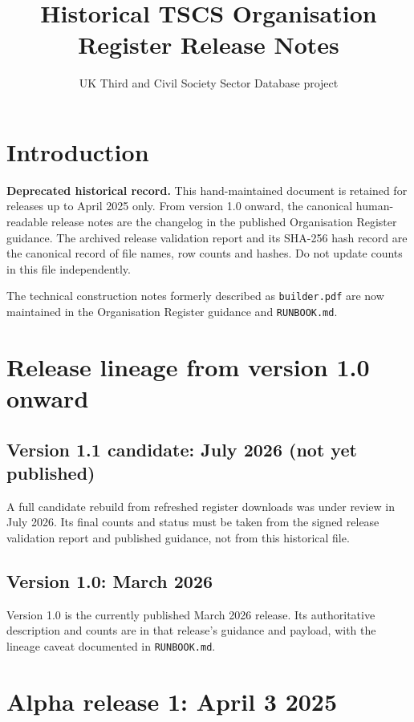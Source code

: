 \documentclass{article}
\title{Historical TSCS Organisation Register Release Notes}
\author{UK Third and Civil Society Sector Database project}
\begin{document}
\maketitle

\section{Introduction  }

\textbf{Deprecated historical record.} This hand-maintained document is retained
for releases up to April 2025 only. From version 1.0 onward, the canonical
human-readable release notes are the changelog in the published Organisation
Register guidance. The archived release validation report and its SHA-256 hash
record are the canonical record of file names, row counts and hashes. Do not
update counts in this file independently.

The technical construction notes formerly described as \texttt{builder.pdf}
are now maintained in the Organisation Register guidance and
\texttt{RUNBOOK.md}.

\section{Release lineage from version 1.0 onward}

\subsection*{Version 1.1 candidate: July 2026 (not yet published)}

A full candidate rebuild from refreshed register downloads was under review in
July 2026. Its final counts and status must be taken from the signed release
validation report and published guidance, not from this historical file.

\subsection*{Version 1.0: March 2026}

Version 1.0 is the currently published March 2026 release. Its authoritative
description and counts are in that release's guidance and payload, with the
lineage caveat documented in \texttt{RUNBOOK.md}.

\section{Alpha release 1: April 3 2025}
\end{document}
